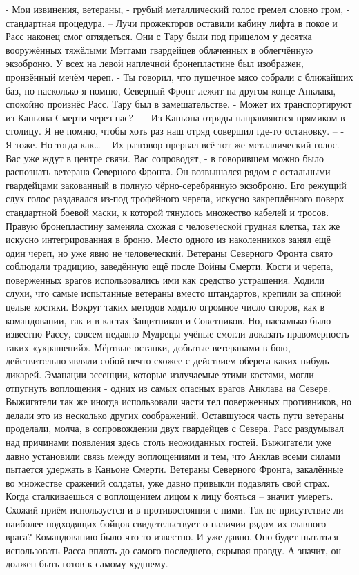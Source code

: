 \documentclass[a4paper, 12pt]{report}
\begin{document}
- Мои извинения, ветераны, - грубый металлический голос гремел словно гром, - стандартная процедура. –
 	Лучи прожекторов оставили кабину лифта в покое и Расс наконец смог оглядеться. Они с Тару были под прицелом у десятка вооружённых тяжёлыми Мэггами гвардейцев облаченных в облегчённую экзоброню. У всех на левой наплечной бронепластине был изображен, пронзённый мечём череп. 
	- Ты говорил, что пушечное мясо собрали с ближайших баз, но насколько я помню, Северный Фронт лежит на другом конце Анклава, - спокойно произнёс Расс. Тару был в замешательстве.
	- Может их транспортируют из Каньона Смерти через нас? – 
	- Из Каньона отряды направляются прямиком в столицу. Я не помню, чтобы хоть раз наш отряд совершил где-то остановку. – 
	- Я тоже. Но тогда как… –
	Их разговор прервал всё тот же металлический голос.
	- Вас уже ждут в центре связи. Вас сопроводят, - в говорившем можно было распознать ветерана Северного Фронта. Он возвышался рядом с остальными гвардейцами закованный в полную чёрно-серебрянную экзоброню. Его режущий слух голос раздавался из-под трофейного черепа, искусно закреплённого поверх стандартной боевой маски, к которой тянулось множество кабелей и тросов. Правую бронепластину заменяла схожая с человеческой грудная клетка, так же искусно интегрированная в броню. Место одного из наколенников занял ещё один череп, но уже явно не человеческий. 
Ветераны Северного Фронта свято соблюдали традицию, заведённую ещё после Войны Смерти. Кости и черепа, поверженных врагов использовались ими как средство устрашения. Ходили слухи, что самые испытанные ветераны вместо штандартов, крепили за спиной целые костяки. Вокруг таких методов ходило огромное число споров, как в командовании, так и в кастах Защитников и Советников. Но, насколько было известно Рассу, совсем недавно Мудрецы-учёные смогли доказать правомерность таких «украшений». Мёртвые останки, добытые ветеранами в бою, действительно являли собой нечто схожее с действием оберега каких-нибудь дикарей. Эманации эссенции, которые излучаемые этими костями, могли отпугнуть воплощения - одних из самых опасных врагов Анклава на Севере. Выжигатели так же иногда использовали части тел поверженных противников, но делали это из несколько других соображений.
Оставшуюся часть пути ветераны проделали, молча, в сопровождении двух гвардейцев с Севера. Расс раздумывал над причинами появления здесь столь неожиданных гостей. Выжигатели уже давно установили связь между воплощениями и тем, что Анклав всеми силами пытается удержать в Каньоне Смерти. Ветераны Северного Фронта, закалённые во множестве сражений солдаты, уже давно привыкли подавлять свой страх. Когда сталкиваешься с воплощением лицом к лицу бояться – значит умереть. Схожий приём используется и в противостоянии с ними. Так не присутствие ли наиболее подходящих бойцов свидетельствует о наличии рядом их главного врага? Командованию было что-то известно. И уже давно. Оно будет пытаться использовать Расса вплоть до самого последнего, скрывая правду. А значит, он должен быть готов к самому худшему. 
\end{document}
